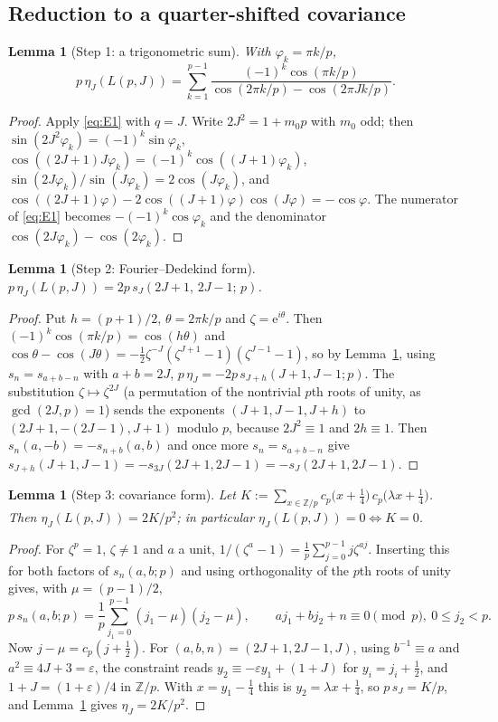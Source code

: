 \documentclass[11pt]{article}
\newtheorem{lemma}[theorem]{Lemma}
\theoremstyle{definition}
\newcommand{\Z}{\mathbb Z}
\newcommand{\e}{\mathrm e}
\begin{document}
\subsection{Reduction to a quarter-shifted covariance}

\begin{lemma}[Step 1: a trigonometric sum]
\label{lem:C3-step1}
With $\varphi_k=\pi k/p$,
\[
 p\,\eta_J(L(p,J))=\sum_{k=1}^{p-1}
 \frac{(-1)^k\cos(\pi k/p)}{\cos(2\pi k/p)-\cos(2\pi Jk/p)} .
\]
\end{lemma}

\begin{proof}
Apply \eqref{eq:E1} with $q=J$.  Write $2J^2=1+m_0p$ with $m_0$ odd;
then $\sin(2J^2\varphi_k)=(-1)^k\sin\varphi_k$,
$\cos((2J+1)J\varphi_k)=(-1)^k\cos((J+1)\varphi_k)$,
$\sin(2J\varphi_k)/\sin(J\varphi_k)=2\cos(J\varphi_k)$, and
$\cos((2J+1)\varphi)-2\cos((J+1)\varphi)\cos(J\varphi)=-\cos\varphi$.
The numerator of \eqref{eq:E1} becomes $-(-1)^k\cos\varphi_k$ and the
denominator $\cos(2J\varphi_k)-\cos(2\varphi_k)$.
\end{proof}

\begin{lemma}[Step 2: Fourier--Dedekind form]
\label{lem:C3-step2}
$p\,\eta_J(L(p,J))=2p\,s_J(2J+1,\,2J-1;\,p)$.
\end{lemma}

\begin{proof}
Put $h=(p+1)/2$, $\theta=2\pi k/p$ and $\zeta=\e^{i\theta}$.  Then
$(-1)^k\cos(\pi k/p)=\cos(h\theta)$ and
$\cos\theta-\cos(J\theta)=-\tfrac12\zeta^{-J}(\zeta^{J+1}-1)(\zeta^{J-1}-1)$,
so by Lemma~\ref{lem:C3-step1}, using $s_n=s_{a+b-n}$ with $a+b=2J$,
$p\,\eta_J=-2p\,s_{J+h}(J+1,J-1;p)$.  The substitution
$\zeta\mapsto\zeta^{2J}$ (a permutation of the nontrivial $p$th roots of
unity, as $\gcd(2J,p)=1$) sends the exponents $(J+1,J-1,J+h)$ to
$(2J+1,-(2J-1),J+1)$ modulo $p$, because $2J^2\equiv1$ and $2h\equiv1$.
Then $s_n(a,-b)=-s_{n+b}(a,b)$ and once more $s_n=s_{a+b-n}$ give
$s_{J+h}(J+1,J-1)=-s_{3J}(2J+1,2J-1)=-s_J(2J+1,2J-1)$.
\end{proof}

\begin{lemma}[Step 3: covariance form]
\label{lem:C3-step3}
Let $K:=\sum_{x\in\Z/p}c_p\bigl(x+\tfrac14\bigr)\,c_p\bigl(\lambda x+\tfrac14\bigr)$.
Then $\eta_J(L(p,J))=2K/p^2$; in particular
$\eta_J(L(p,J))=0\iff K=0$.
\end{lemma}

\begin{proof}
For $\zeta^p=1$, $\zeta\neq1$ and $a$ a unit,
$1/(\zeta^a-1)=\frac1p\sum_{j=0}^{p-1}j\zeta^{aj}$.  Inserting this for
both factors of $s_n(a,b;p)$ and using orthogonality of the $p$th roots
of unity gives, with $\mu=(p-1)/2$,
\[
 p\,s_n(a,b;p)=\frac1p\sum_{j_1=0}^{p-1}(j_1-\mu)(j_2-\mu),
 \qquad aj_1+bj_2+n\equiv0\pmod p,\ 0\leq j_2<p .
\]
Now $j-\mu=c_p(j+\tfrac12)$.  For $(a,b,n)=(2J+1,2J-1,J)$, using
$b^{-1}\equiv a$ and $a^2\equiv4J+3=\varepsilon$, the constraint reads
$y_2\equiv-\varepsilon y_1+(1+J)$ for $y_i=j_i+\tfrac12$, and
$1+J=(1+\varepsilon)/4$ in $\Z/p$.  With $x=y_1-\tfrac14$ this is
$y_2=\lambda x+\tfrac14$, so $p\,s_J=K/p$, and Lemma~\ref{lem:C3-step2}
gives $\eta_J=2K/p^2$.
\end{proof}
\end{document}
